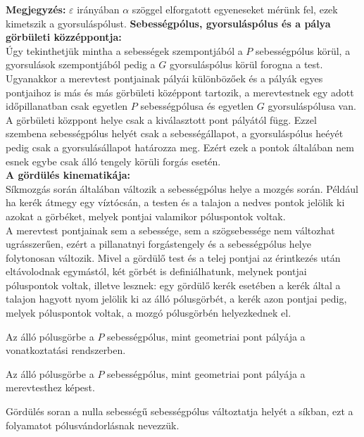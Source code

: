 \textbf{Megjegyzés:} \(\varepsilon\) irányában \(\alpha\) szöggel elforgatott egyeneseket mérünk fel, ezek kimetszik a gyorsuláspólust.
 \textbf{Sebességpólus, gyorsuláspólus és a pálya görbületi közzéppontja:}\\
 Úgy tekinthetjük mintha a sebességek szempontjából a \(P\) sebességpólus körül, a gyorsulások szempontjából pedig a \(G\) gyorsuláspólus körül forogna a test.  Ugyanakkor a merevtest pontjainak pályái különbözőek és a pályák egyes pontjaihoz is más és más görbületi középpont tartozik, a merevtestnek egy adott időpillanatban csak  egyetlen \(P\) sebességpólusa és egyetlen \(G\) gyorsuláspólusa van. 
 A görbületi közppont helye csak a kiválasztott pont pályától függ. Ezzel szembena sebességpólus helyét csak a sebességállapot, a gyorsuláspólus heéyét pedig csak a gyorsulásállapot határozza meg. Ezért ezek a pontok általában nem esnek egybe csak álló tengely körüli forgás esetén.\\
\newpage
 \textbf{A gördülés kinematikája:}\\
Síkmozgás során általában változik a sebességpólus helye a mozgés során. Például ha kerék átmegy egy víztócsán, a testen és a talajon a nedves pontok jelölik ki azokat a görbéket, melyek pontjai valamikor póluspontok voltak. \\
A merevtest pontjainak sem a sebessége, sem a szögsebessége nem változhat ugrásszerűen, ezért a pillanatnyi forgástengely és a sebességpólus helye folytonosan változik. Mivel a gördülő test és a telej pontjai az érintkezés után eltávolodnak egymástól, két görbét is definiálhatunk, melynek pontjai póluspontok voltak, illetve lesznek: egy gördülő kerék esetében a kerék által a talajon hagyott nyom jelölik ki az álló pólusgörbét, a kerék azon pontjai pedig, melyek póluspontok voltak, a mozgó pólusgörbén helyezkednek el.
\begin{tcolorbox}[colback=MidnightBlue!5!white,colframe=MidnightBlue!60!black,title= Definíció]
    Az álló pólusgörbe a \(P\) sebességpólus, mint geometriai pont pályája a vonatkoztatási rendszerben.
 \end{tcolorbox}
\begin{tcolorbox}[colback=MidnightBlue!5!white,colframe=MidnightBlue!60!black,title= Definíció]
    Az álló pólusgörbe a \(P\) sebességpólus, mint geometriai pont pályája a merevtesthez képest.
 \end{tcolorbox}
 Gördülés soran a nulla sebességű sebességpólus változtatja helyét a síkban, ezt a folyamatot pólusvándorlásnak nevezzük.
